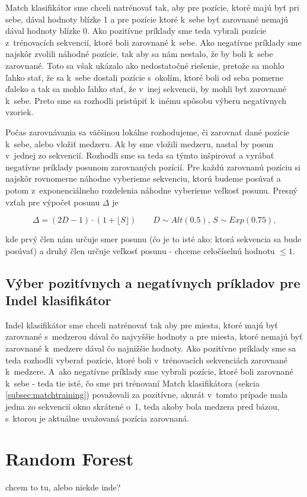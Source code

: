 Match klasifikátor sme chceli natrénovať tak, aby pre pozície, ktoré majú byť pri sebe, dával hodnoty blízke 1 a pre pozície ktoré k~sebe byť zarovnané nemajú dával hodnoty blízke 0.
Ako pozitívne príklady sme teda vybrali pozície z~trénovacích sekvencií, ktoré boli zarovnané k~sebe. Ako negatívne príklady sme najskôr zvolili náhodné pozície, tak aby sa nám nestalo, že by boli k~sebe zarovnané. Toto sa však ukázalo ako nedostatočné riešenie, pretože sa mohlo ľahko stať, že sa k~sebe dostali pozície s~okolím, ktoré boli od seba pomerne ďaleko a tak sa mohlo ľahko stať, že v~inej sekvencii, by mohli byť zarovnané k~sebe. Preto sme sa rozhodli pristúpiť k~inému spôsobu výberu negatívnych vzoriek.

Počas zarovnávania sa väčšinou lokálne rozhodujeme, či zarovnať dané pozície k~sebe, alebo vložiť medzeru. Ak by sme vložili medzeru, nastal by posun v~jednej zo sekvencií. Rozhodli sme sa teda sa týmto inšpirovať a vyrábať negatívne príklady posunom zarovnaných pozícií. Pre každú zarovnanú pozíciu si najskôr rovnomerne náhodne vyberieme sekvenciu, ktorú budeme posúvať a potom z~exponenciálneho rozdelenia náhodne vyberieme veľkosť posunu. Presný vzťah pre výpočet posunu $\Delta$ je

$$\Delta = \left(2D-1\right)\cdot \left(1+\lfloor S\rfloor\right)\qquad D\sim Alt(0.5),\, S\sim Exp(0.75),$$

kde prvý člen nám určuje smer posunu (čo je to isté ako: ktorá sekvencia sa bude posúvať) a druhý člen určuje veľkosť posunu - chceme celočíselnú hodnotu $\leq 1$.

\subsection{Výber pozitívnych a negatívnych príkladov pre Indel klasifikátor}

Indel klasifikátor sme chceli natrénovať tak aby pre miesta, ktoré majú byť zarovnané s~medzerou dával čo najvyššie hodnoty a pre miesta, ktoré nemajú byť zarovnané k~medzere dával čo najnižšie hodnoty. Ako pozitívne príklady sme sa teda rozhodli vyberať pozície, ktoré boli v~trénovacích sekvenciách zarovnané k~medzere. A~ako negatívne príklady sme vybrali pozície, ktoré boli zarovnané k~sebe - teda tie isté, čo sme pri trénovaní Match klasifikátora (sekcia \ref{subsec:matchtraining}) považovali za pozitívne, akurát v~tomto prípade mala jedna zo sekvencií okno skrátené o~1, teda akoby bola medzera pred bázou, s~ktorou je aktuálne uvažovaná pozícia zarovnaná.

\section{Random Forest}

\todo chcem to tu, alebo niekde inde?

\todo



